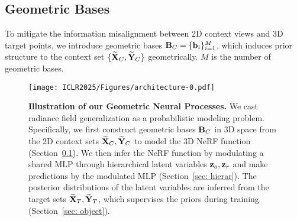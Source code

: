 \subsection{Geometric Bases} 
\label{sec: geometrybases}
To mitigate the information misalignment between 2D context views and 3D target points, we introduce geometric bases ${\bf{{B}}}_{C}=\{{\bf{b}}_i\}_{i=1}^{M}$, which {induces prior structure to the context set} $\{{\bf{\widetilde{X}}}_{C}, {\bf{\widetilde{Y}}}_{C}\}$ geometrically. $M$ is the number of geometric bases. 

\begin{figure*}[t]
  \centering  \texttt{[image: ICLR2025/Figures/architecture-0.pdf]} %
\caption{\textbf{Illustration of our Geometric Neural Processes.} 
We cast radiance field generalization as a probabilistic modeling problem. Specifically, we first construct geometric bases ${\bf{B}}_C$ in 3D space from the 2D context sets ${\bf{\widetilde{X}}}_{C}, {\bf{\widetilde{Y}}}_{C}$ to model the 3D NeRF function (Section~\ref{sec: geometrybases}). We then infer the NeRF function by modulating a shared MLP through hierarchical latent variables ${\bf{z}}_{o}, {\bf{z}}_{r}$ and make predictions by the modulated MLP (Section~\ref{sec: hierar}). 
  The posterior distributions of the latent variables are inferred from the target sets ${\bf{\widetilde{X}}}_{T}, {\bf{\widetilde{Y}}}_{T}$, which supervises the priors during training (Section~\ref{sec: object}). 
  } %
  \label{fig: framework}
\end{figure*}

